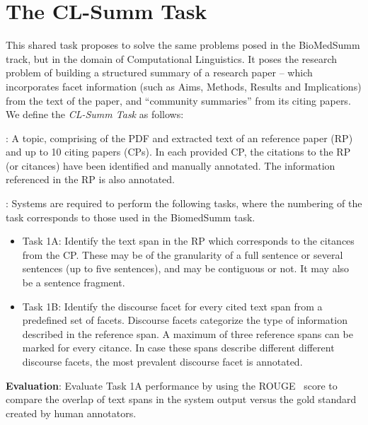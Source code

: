 \documentclass[11pt]{article}
\begin{document}

\section{The CL-Summ Task}
This shared task proposes to solve the same problems posed in the BioMedSumm track, but in the 
domain of Computational Linguistics. It poses the research problem of building a structured 
summary of a research paper -- which incorporates facet information (such as Aims, Methods, 
Results and Implications) from the text of the paper, and ``community summaries'' from its 
citing papers. \\

\noindent We define the {\it CL-Summ Task} as follows:

: A topic, comprising of the PDF and extracted
text of an reference paper (RP) and up to 10 citing papers (CPs).  In
each provided CP, the citations to the RP (or citances) have been
identified and manually annotated. The information referenced in the
RP is also annotated.

: Systems are required to perform the following
tasks, where the numbering of the task corresponds to those used in
the BiomedSumm task.

\begin{itemize}
\item Task 1A: Identify the text span in the RP which corresponds to the citances from the CP. 
  These may be of the granularity of a full   sentence or several sentences (up to five sentences), 
  and may be contiguous or not. It may also be a sentence fragment.
\vspace{-.3cm}
\item Task 1B: Identify the discourse facet for every cited text span from a predefined set of 
  facets. Discourse facets categorize the type of information described in the reference span. 
  A maximum of three reference spans can be marked for every citance. In case these spans describe 
  different different discourse facets, the most prevalent discourse facet is annotated.
\end{itemize}
{\bf Evaluation}: Evaluate Task 1A performance by using the ROUGE~\cite{Lin:2004} score to 
compare the overlap of text spans in the system output versus the gold standard created by 
human annotators.
\end{document}
